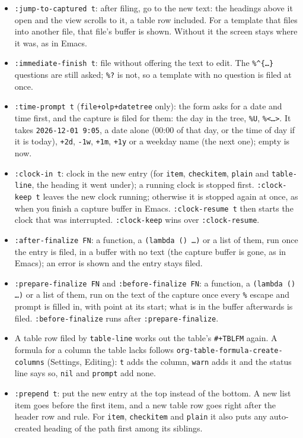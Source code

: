 \documentclass[11pt]{article}
\begin{document}
\begin{itemize}
\item \texttt{:jump-to-captured t}: after filing, go to the new text: the headings above it open and the view scrolls to it, a table row included. For a template that files into another file, that file's buffer is shown. Without it the screen stays where it was, as in Emacs.
\item \texttt{:immediate-finish t}: file without offering the text to edit. The \texttt{\%\textasciicircum{}\{…\}} questions are still asked; \texttt{\%?} is not, so a template with no question is filed at once.
\item \texttt{:time-prompt t} (\texttt{file+olp+datetree} only): the form asks for a date and time first, and the capture is filed for them: the day in the tree, \texttt{\%U}, \texttt{\%<…>}. It takes \texttt{2026-12-01 9:05}, a date alone (00:00 of that day, or the time of day if it is today), \texttt{+2d}, \texttt{-1w}, \texttt{+1m}, \texttt{+1y} or a weekday name (the next one); empty is now.
\item \texttt{:clock-in t}: clock in the new entry (for \texttt{item}, \texttt{checkitem}, \texttt{plain} and \texttt{table-line}, the heading it went under); a running clock is stopped first. \texttt{:clock-keep t} leaves the new clock running; otherwise it is stopped again at once, as when you finish a capture buffer in Emacs. \texttt{:clock-resume t} then starts the clock that was interrupted. \texttt{:clock-keep} wins over \texttt{:clock-resume}.
\item \texttt{:after-finalize FN}: a function, a \texttt{(lambda () …)} or a list of them, run once the entry is filed, in a buffer with no text (the capture buffer is gone, as in Emacs); an error is shown and the entry stays filed.
\item \texttt{:prepare-finalize FN} and \texttt{:before-finalize FN}: a function, a \texttt{(lambda () …)} or a list of them, run on the text of the capture once every \texttt{\%} escape and prompt is filled in, with point at its start; what is in the buffer afterwards is filed. \texttt{:before-finalize} runs after \texttt{:prepare-finalize}.
\item A table row filed by \texttt{table-line} works out the table's \texttt{\#+TBLFM} again. A formula for a column the table lacks follows \texttt{org-table-formula-create-columns} (Settings, Editing): \texttt{t} adds the column, \texttt{warn} adds it and the status line says so, \texttt{nil} and \texttt{prompt} add none.
\item \texttt{:prepend t}: put the new entry at the top instead of the bottom. A new list item goes before the first item, and a new table row goes right after the header row and rule. For \texttt{item}, \texttt{checkitem} and \texttt{plain} it also puts any auto-created heading of the path first among its siblings.

\end{itemize}
\end{document}

